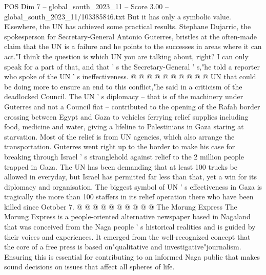 \begin{textsample}{POS Dim 7 – global\_south\_2023\_11 – Score 3.00 – global\_south\_2023\_11/103385846.txt}
But it has only a symbolic value.
Elsewhere, the UN has achieved some practical results.
Stephane Dujarric, the spokesperson for Secretary-General Antonio Guterres, bristles at the often-made claim that the UN is a failure and he points to the successes in areas where it can act."I think the question is which UN you are talking about, right?
I can only speak for a part of that, and that ' s the Secretary-General ' s,"he told a reporter who spoke of the UN ' s ineffectiveness. @ @ @ @ @ @ @ @ @ @ UN that could be doing more to ensure an end to this conflict,"he said in a criticism of the deadlocked Council.
The UN ' s diplomacy -- that is of the machinery under Guterres and not a Council fiat -- contributed to the opening of the Rafah border crossing between Egypt and Gaza to vehicles ferrying relief supplies including food, medicine and water, giving a lifeline to Palestinians in Gaza staring at starvation.
Most of the relief is from UN agencies, which also arrange the transportation.
Guterres went right up to the border to make his case for breaking through Israel ' s stranglehold against relief to the 2 million people trapped in Gaza.
The UN has been demanding that at least 100 trucks be allowed in everyday, but Israel has permitted far less than that, yet a win for its diplomacy and organisation.
The biggest symbol of UN ' s effectiveness in Gaza is tragically the more than 100 staffers in its relief operation there who have been killed since October 7. @ @ @ @ @ @ @ @ @ @ The Morung Express The Morung Express is a people-oriented alternative newspaper based in Nagaland that was conceived from the Naga people ' s historical realities and is guided by their voices and experiences.
It emerged from the well-recognized concept that the core of a free press is based on"qualitative and investigative"journalism.
Ensuring this is essential for contributing to an informed Naga public that makes sound decisions on issues that affect all spheres of life.

\end{textsample}
